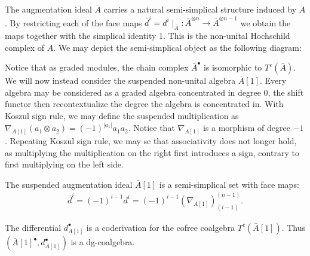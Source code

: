 \documentclass[../thesis.tex]{subfiles}
\begin{document}
            The augmentation ideal $\bar{A}$ carries a natural semi-simplical structure induced by $A$. By restricting each of the face maps ${\bar{d}}^i = d^i {\mid}_{\bar{A}}:\bar{A}^{\otimes n} \rightarrow \bar{A}^{\otimes n-1}$ we obtain the maps together with the simplical identity 1. This is the non-unital Hochschild complex of $A$. We may depict the semi-simplical object as the following diagram:
            \begin{center}
            \end{center}

            Notice that as graded modules, the chain complex $\bar{A}^\bullet$ is isomorphic to $T^c(\bar{A})$. We will now instead consider the suspended non-unital algebra $\bar{A}[1]$. Every algebra may be considered as a graded algebra concentrated in degree $0$, the shift functor then recontextualize the degree the algebra is concentrated in. With Koszul sign rule, we may define the suspended multiplication as $\nabla_{A[1]}(a_1 \otimes a_2) = (-1)^{|a_1|}a_1a_2$. Notice that $\nabla_{A[1]}$ is a morphism of degree $-1$. Repeating Koszul sign rule, we may se that associativity does not longer hold, as multiplying the multiplication on the right first introduces a sign, contrary to first multiplying on the left side.

            \begin{proposition}
                The suspended augmentation ideal $\bar{A}[1]$ is a semi-simplical set with face maps:
                \begin{align*}
                    \bar{d}^i = (-1)^{i-1}d^i = (-1)^{i-1}(\nabla_{A[1]})_{(i-1)}^{(n-1)}\text{.}
                \end{align*}
            \end{proposition}

            \begin{corollary}\label{cor: a-to-dgc}
                The differential $d_{\bar{A}[1]}^\bullet$ is a coderivation for the cofree coalgebra $T^c(\bar{A}[1])$. Thus $(\bar{A}[1]^\bullet, d_{\bar{A}[1]}^\bullet)$ is a dg-coalgebra.
            \end{corollary}
\end{document}
